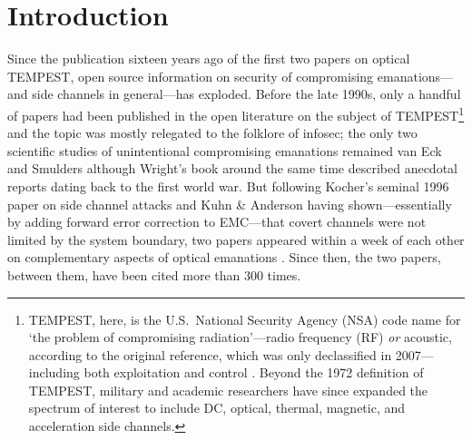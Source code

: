 \documentclass[conference]{IEEEtran}
\begin{document}
\title{}

\author{
}


\maketitle

\begin{abstract}
	
\end{abstract}

\section{Introduction}

Since the publication sixteen years ago of the first two papers on optical
TEMPEST, open source information on security of compromising emanations---and
side channels in general---has exploded. Before the late 1990s, only a
handful of papers had been published in the open literature on the subject of
TEMPEST\footnote{TEMPEST, here, is the U.S.\ National Security Agency (NSA)
code name for `the problem of compromising radiation'---radio frequency (RF)
\emph{or} acoustic, according to the original reference, which was only
declassified in 2007---including both exploitation and control
\cite{NSATempest2007}. Beyond the 1972 definition of TEMPEST, military and
academic researchers have since expanded the spectrum of interest to include
DC, optical, thermal, magnetic, and acceleration side channels.} and the
topic was mostly relegated to the folklore of infosec; the only two
scientific studies of unintentional compromising emanations remained van Eck
\cite{vanEck1985} and Smulders \cite{Smulders1990} although Wright's book
around the same time \cite{Wright1987} described anecdotal reports dating
back to the first world war. But following Kocher's seminal 1996 paper on
side channel attacks \cite{Kocher1996} and Kuhn \& Anderson \cite{Kuhn1998a}
having shown---essentially by adding forward error correction to EMC---that
covert channels were not limited by the system boundary, two papers appeared
within a week of each other on complementary aspects of optical emanations
\cite{Kuhn2002,Loughry2002a}. Since then, the two papers, between them, have
been cited more than 300 times.
\end{document}
